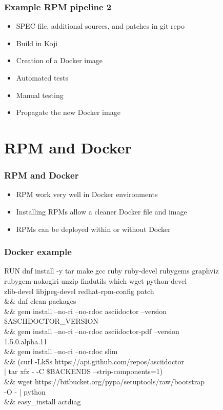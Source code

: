 \documentclass[t,aspectratio=169]{beamer}
\begin{document}
\begin{frame}
    \frametitle{Example RPM pipeline 2}
    \begin{itemize}
        \item<2-> SPEC file, additional sources, and patches in git repo
        \item<3-> Build in Koji
        \item<4-> Creation of a Docker image
        \item<5-> Automated tests
        \item<6-> Manual testing
        \item<7-> Propagate the new Docker image
    \end{itemize}
\end{frame}

\section{RPM and Docker}
\begin{frame}
    \frametitle{RPM and Docker}
    \begin{itemize}
        \item<2-> RPM work very well in Docker environments
        \item<3-> Installing RPMs allow a cleaner Docker file and image
        \item<4-> RPMs can be deployed within or without Docker
    \end{itemize}
\end{frame}

\begin{frame}[fragile]
    \frametitle{Docker example}
    \begin{semiverbatim}
RUN dnf install -y tar make gcc ruby ruby-devel rubygems graphviz \\
  rubygem-nokogiri unzip findutils which wget python-devel \\ 
  zlib-devel libjpeg-devel redhat-rpm-config patch \\
  \&\& dnf clean packages \\
  \&\& gem install --no-ri --no-rdoc asciidoctor --version \\
    \$ASCIIDOCTOR\_VERSION \\
  \&\& gem install --no-ri --no-rdoc asciidoctor-pdf --version \\
    1.5.0.alpha.11 \\
  \&\& gem install --no-ri --no-rdoc slim \\
  \&\& (curl -LkSs https://api.github.com/repos/asciidoctor \\
    | tar xfz - -C \$BACKENDS --strip-components=1) \\
  \&\& wget https://bitbucket.org/pypa/setuptools/raw/bootstrap \\
     -O - | python \\
  \&\& easy\_install actdiag
    \end{semiverbatim}
\end{frame}
\end{document}

